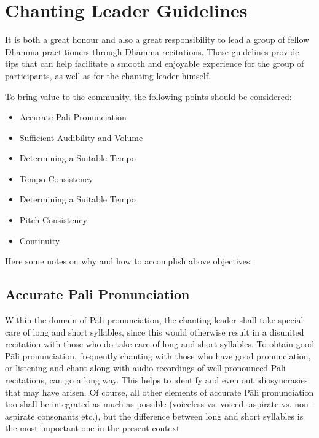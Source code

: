 \section{Chanting Leader Guidelines}

\begin{justify}
  It is both a great honour and also a great responsibility to lead a group of fellow Dhamma practitioners through Dhamma recitations. These guidelines provide tips that can help facilitate a smooth and enjoyable experience for the group of participants, as well as for the chanting leader himself.
\end{justify}

To bring value to the community, the following points should be considered:

\begin{itemize}
  \item Accurate Pāli Pronunciation
  \item Sufficient Audibility and Volume
  \item Determining a Suitable Tempo
  \item Tempo Consistency
  \item Determining a Suitable Tempo
  \item Pitch Consistency
  \item Continuity
\end{itemize}

Here some notes on why and how to accomplish above objectives:\\

\subsection*{Accurate Pāli Pronunciation}
\begin{justify}
  Within the domain of Pāli pronunciation, the chanting leader shall take special care of long and short syllables, since this would otherwise result in a disunited recitation with those who do take care of long and short syllables. To obtain good Pāli pronunciation, frequently chanting with those who have good pronunciation, or listening and chant along with audio recordings of well-pronounced Pāli recitations, can go a long way. This helps to identify and even out idiosyncrasies that may have arisen. Of course, all other elements of accurate Pāli pronunciation too shall be integrated as much as possible (voiceless vs. voiced, aspirate vs. non-aspirate consonants etc.), but the difference between long and short syllables is the most important one in the present context.
\end{justify}

